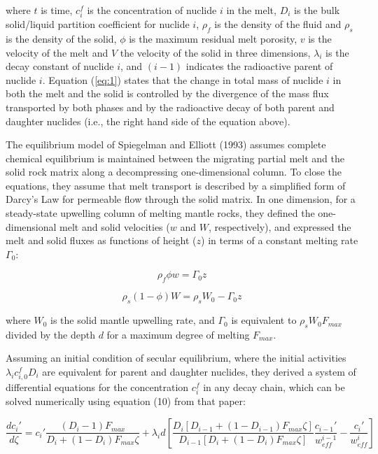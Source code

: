 \documentclass[11pt]{article}
\begin{document}
where $t$ is time, $c_i^f$ is the concentration of nuclide $i$ in the melt, $D_i$ is the bulk solid/liquid partition coefficient for nuclide $i$, $\rho_f$ is the density of the fluid and $\rho_s$ is the density of the solid, $\phi$ is the maximum residual melt porosity, $v$ is the velocity of the melt and $V$ the velocity of the solid in three dimensions, $\lambda_i$ is the decay constant of nuclide $i$, and $(i-1)$ indicates the radioactive parent of nuclide $i$. Equation (\ref{eq:1}) states that the change in total mass of nuclide $i$ in both the melt and the solid is controlled by the divergence of the mass flux transported by both phases and by the radioactive decay of both parent and daughter nuclides (i.e., the right hand side of the equation above).

The equilibrium model of Spiegelman and Elliott (1993) assumes complete chemical equilibrium is maintained between the migrating partial melt and the solid rock matrix along a decompressing one-dimensional column. To close the equations, they assume that melt transport is described by a simplified form of Darcy’s Law for permeable flow through the solid matrix. In one dimension, for a steady-state upwelling column of melting mantle rocks, they defined the one-dimensional melt and solid velocities ($w$ and $W$, respectively), and expressed the melt and solid fluxes as functions of height ($z$) in terms of a constant melting rate $\Gamma_0$:

\begin{equation}
    \rho_f \phi w = \Gamma_0 z\label{eq:2}
\end{equation}

\begin{equation}
    \rho_s (1 - \phi) W = \rho_s W_0 - \Gamma_0 z\label{eq:3}
\end{equation}

where $W_0$ is the solid mantle upwelling rate, and $\Gamma_0$ is equivalent to $\rho_s W_0 F_{max}$ divided by the depth $d$ for a maximum degree of melting $F_{max}$.

Assuming an initial condition of secular equilibrium, where the initial activities $\lambda_i c_{i,0}^f D_i$ are equivalent for parent and daughter nuclides, they derived a system of differential equations for the concentration $c_i^f$ in any decay chain, which can be solved numerically using equation (10) from that paper:

\begin{equation}
    \frac{dc_i'}{d\zeta} = c_i' \frac{(D_i-1)F_{max}}{D_i + (1-D_i)F_{max} \zeta} + \lambda_i d\left[ \frac{D_i[D_{i-1}+(1-D_{i-1})F_{max}\zeta]}{D_{i-1}[D_i + (1-D_i)F_{max}\zeta]} \frac{c_{i-1}'}{w_{eff}^{i-1}} - \frac{c_i'}{w_{eff}^i}\right]\label{eq:4}
\end{equation}
\end{document}
